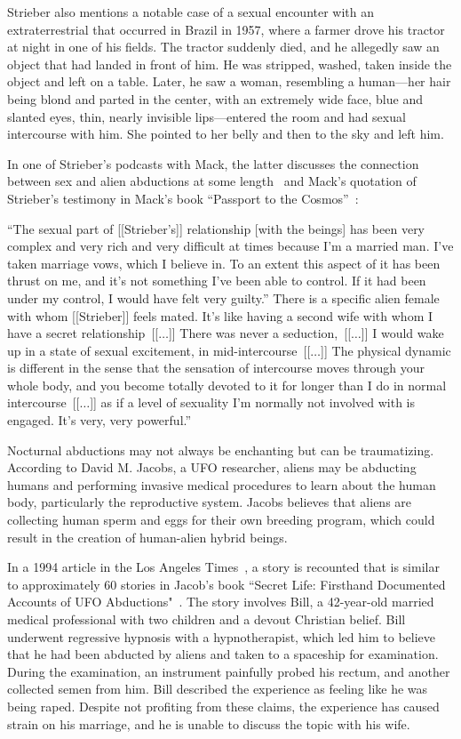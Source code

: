 Strieber also mentions
a notable case of a sexual encounter with an extraterrestrial that occurred in Brazil in 1957,
where a farmer drove his tractor at night in one of his fields. The tractor suddenly died, and he allegedly
saw an object that had landed in front of him. He was stripped, washed, taken inside the object and left on a table.
Later, he saw a woman, resembling a human---her hair being blond and parted in the center, with an extremely wide face,
blue and slanted eyes, thin, nearly invisible lips---entered the room and had sexual intercourse with him.
She pointed to her belly and then to the sky and left him.

In one of Strieber's podcasts with Mack, the latter discusses the connection between sex
and alien abductions at some length~\cite[time=26m30s]{Strieber2023Jan} and Mack's quotation of Strieber's testimony
in Mack's book ``Passport to the {C}osmos''~\cite{Mack1999PC}:
\begin{svgraybox}
``The sexual part of [[Strieber's]] relationship [with the beings] has been very complex and very rich and very difficult at times
because I'm a married man.
I've taken marriage vows, which I believe in.
To an extent this aspect of it has been thrust on me, and it's not something I've been able to control.
If it had been under my control, I would have felt very guilty.''
There is a specific alien female with whom [[Strieber]] feels mated.
It's like having a second wife with whom I have a secret relationship~[[$\ldots$]]
There was never a seduction,~[[$\ldots$]]  I would wake up in a state of sexual excitement, in mid-intercourse~[[$\ldots$]]
The physical dynamic is different in the sense that the sensation of intercourse moves through your whole body,
and you become totally devoted to it for longer than I do in normal intercourse~[[$\ldots$]]
as if a level of sexuality I'm normally not involved with is engaged. It's very, very powerful.''
\end{svgraybox}


Nocturnal abductions may not always be enchanting but can be traumatizing. According to David M. Jacobs, a UFO researcher, aliens may be abducting humans and performing invasive medical procedures to learn about the human body, particularly the reproductive system. Jacobs believes that aliens are collecting human sperm and eggs for their own breeding program, which could result in the creation of human-alien hybrid beings.

In a 1994 article in the Los Angeles Times~\cite{Hulse2019Mar}, a story is recounted that is similar to approximately 60 stories in Jacob's book ``Secret Life: Firsthand Documented Accounts of UFO Abductions"~\cite{Jacobs1993Apr}. The story involves Bill, a 42-year-old married medical professional with two children and a devout Christian belief. Bill underwent regressive hypnosis with a hypnotherapist, which led him to believe that he had been abducted by aliens and taken to a spaceship for examination. During the examination, an instrument painfully probed his rectum, and another collected semen from him. Bill described the experience as feeling like he was being raped. Despite not profiting from these claims, the experience has caused strain on his marriage, and he is unable to discuss the topic with his wife.


